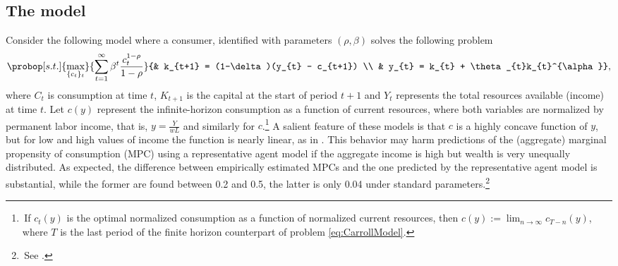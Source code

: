 \documentclass[english, a4paper, 12pt]{article}
\begin{document}
\subsection{The model}
Consider the following model where a consumer, identified with parameters $(\rho, \beta)$ solves the following problem
	\begin{equation} \label{eq:CarrollModel}
		\probop[s.t.]{\max_{\{c_{t}\}_{t}}}{\sum_{t=1}^{\infty} \beta^{t}\frac{c_{t}^{1-\rho}}{1-\rho}}
					{&	k_{t+1} = (1-\delta)(y_{t} - c_{t+1})	\\
					&	y_{t} = k_{t} + \theta_{t}k_{t}^{\alpha}},
	\end{equation}
where $C_{t}$ is consumption at time $t$, $K_{t+1}$ is the capital at the start of period $t+1$ and $Y_{t}$ represents the total resources available (income) at time $t$. Let $c(y)$ represent the infinite-horizon consumption as a function of current resources, where both variables are normalized by permanent labor income, that is, $y = \frac{Y}{wL}$ and similarly for $c$.\footnote{\,If $c_{t}(y)$ is the optimal normalized consumption as a function of normalized current resources, then $c(y) := \lim_{n \to \infty} c_{T-n}(y)$, where $T$ is the last period of the finite horizon counterpart of problem \eqref{eq:CarrollModel}.} A salient feature of these models is that $c$ is a highly concave function of $y$, but for low and high values of income the function is nearly linear, as in . This behavior may harm predictions of the (aggregate) marginal propensity of consumption (MPC) using a representative agent model if the aggregate income is high but wealth is very unequally distributed. As expected, the difference between empirically estimated MPCs and the one predicted by the representative agent model is substantial, while the former are found between 0.2 and 0.5, the latter is only 0.04 under standard parameters.\footnote{\,See \cite{CarrollRequiem}.}
\vfill
\end{document}
